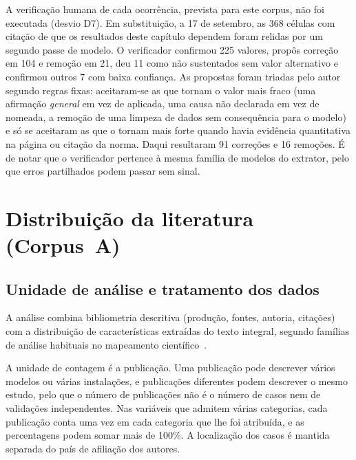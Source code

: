 A verificação humana de cada ocorrência, prevista para este corpus, não foi
executada (desvio D7). Em substituição, a 17 de setembro, as 368 células
com citação de que os resultados deste capítulo dependem foram relidas por
um segundo passe de modelo. O verificador confirmou 225 valores, propôs
correção em 104 e remoção em 21, deu 11 como não sustentados sem valor
alternativo e confirmou outros 7 com baixa confiança. As propostas foram
triadas pelo autor segundo regras fixas: aceitaram-se as que tornam o valor mais
fraco (uma afirmação \emph{general} em vez de aplicada, uma causa não
declarada em vez de nomeada, a remoção de uma limpeza de dados sem
consequência para o modelo) e só se aceitaram as que o tornam mais forte
quando havia evidência quantitativa na página ou citação da norma. Daqui
resultaram 91 correções e 16 remoções. É de notar que o verificador pertence à
mesma família de modelos do extrator, pelo que erros partilhados podem
passar sem sinal. 

\section{Distribuição da literatura (Corpus~A)}
\label{sec:corpus-a}

\subsection{Unidade de análise e tratamento dos dados}

A análise combina bibliometria descritiva (produção, fontes, autoria,
citações) com a distribuição de características extraídas do texto integral,
segundo famílias de análise habituais no mapeamento
científico~\cite{Aria2017Bibliometrix,VanEck2010VOSviewer}. 

A unidade de contagem é a publicação. Uma publicação pode descrever vários
modelos ou várias instalações, e publicações diferentes podem descrever o
mesmo estudo, pelo que o número de publicações não é o número de casos nem
de validações independentes. Nas variáveis que admitem várias categorias,
cada publicação conta uma vez em cada categoria que lhe foi atribuída, e as
percentagens podem somar mais de 100\%.  A localização dos casos é mantida
separada do país de afiliação dos autores.

